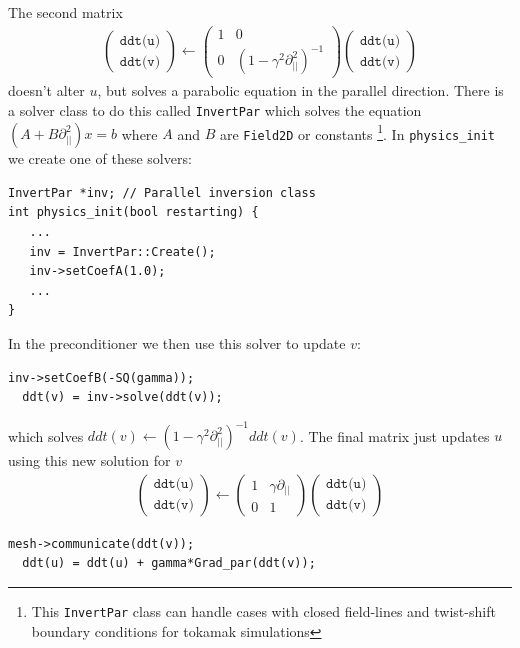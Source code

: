 \documentclass[12pt]{article}
\def\L{\left}
\def\R{\right}
\def\Larrow{\leftarrow}
\begin{document}
The second matrix
%
\begin{align}
\L(%
\begin{array}{c}
\texttt{ddt(u)} \\
\texttt{ddt(v)}
\end{array}
%
\R) \Larrow \L(%
\begin{array}{cc}
1 & 0 \\
0 & \L(1 - \gamma^2\partial^2_{||}\R)^{-1}
\end{array}
%
\R)\L(%
\begin{array}{c}
\texttt{ddt(u)} \\
\texttt{ddt(v)}
\end{array}
%
\R)
\end{align}
%
doesn't alter $u$, but solves a parabolic equation in the parallel direction.
There is a solver class to do this called \texttt{InvertPar} which solves the
equation $\L(A + B\partial_{||}^2\R)x = b$ where $A$ and $B$ are
%
\lstinline!Field2D!
%
 or constants
%
\footnote{This \texttt{InvertPar} class can handle cases with closed
field-lines and twist-shift boundary conditions for tokamak simulations}. In
%
\lstinline!physics_init!
%
 we create one of these solvers:
%
\begin{lstlisting}[numbers=none]
InvertPar *inv; // Parallel inversion class
int physics_init(bool restarting) {
   ...
   inv = InvertPar::Create();
   inv->setCoefA(1.0);
   ...
}
\end{lstlisting}
%
In the preconditioner we then use this solver to update $v$:
%
\begin{lstlisting}[numbers=none]
  inv->setCoefB(-SQ(gamma));
  ddt(v) = inv->solve(ddt(v));
\end{lstlisting}
%
which solves $ddt(v) \Larrow \L(1 - \gamma^2\partial_{||}^2\R)^{-1} ddt(v)$.
The final matrix just updates $u$ using this new solution for $v$
%
\begin{align}
\L(%
\begin{array}{c}
\texttt{ddt(u)} \\
\texttt{ddt(v)}
\end{array}
%
\R) \Larrow \L(%
\begin{array}{cc}
1 & \gamma\partial_{||} \\
0 & 1
\end{array}
%
\R)\L(%
\begin{array}{c}
\texttt{ddt(u)} \\
\texttt{ddt(v)}
\end{array}
%
\R)
\end{align}
%
\begin{lstlisting}[numbers=none]
  mesh->communicate(ddt(v));
  ddt(u) = ddt(u) + gamma*Grad_par(ddt(v));
\end{lstlisting}
\end{document}
